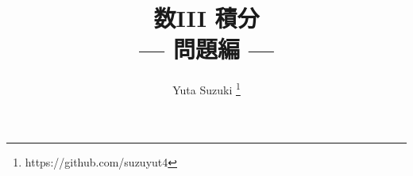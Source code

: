 \documentclass[twocolumn]{ltjsarticle}
\title{
  {\Large 数III 積分} \\
  --- 問題編 ---
}
\author{
  Yuta Suzuki
  \thanks{https://github.com/suzuyut4}
}
\date{}
\numberwithin{equation}{section} %
\begin{document}
\maketitle

\begin{intprob}
\end{intprob}
\begin{intprob}
\end{intprob}
\begin{intprob}
\end{intprob}
\begin{intprob}
\end{intprob}
\begin{intprob}
\end{intprob}
\begin{intprob}
\end{intprob}
\begin{intprob}
\end{intprob}
\begin{intprob}
\end{intprob}
\begin{intprob}
\end{intprob}
\begin{intprob}
\end{intprob}
\begin{intprob}
\end{intprob}
\begin{intprob}
\end{intprob}
\begin{intprob}
\end{intprob}
\begin{intprob}
\end{intprob}
\begin{intprob}
\end{intprob}
\begin{intprob}
\end{intprob}
\begin{intprob}
\end{intprob}
\end{document}
